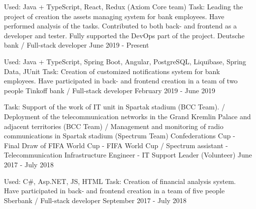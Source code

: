

\vspace{0cm}\begin{cventries}
\cventry
{Used: Java + TypeScript, React, Redux (Axiom Core team)
	\newline Task: Leading the project of creation the assets managing system for bank employees. Have performed analysis of the tasks. Contributed to both back- and frontend as a developer and tester. Fully supported the DevOps part of the project.	
} %
{Deutsche bank / Full-stack developer} %
{} %
{June 2019 - Present} %
\noindent	
	
\cventry
{Used: Java + TypeScript, Spring Boot, Angular, PostgreSQL, Liquibase, Spring Data, JUnit
	\newline Task: Creation of customized notifications system for bank employees. Have participated in back- and frontend creation in a team of two people} %
{Tinkoff bank / Full-stack developer } %
{} %
{February 2019 - June 2019} %
\noindent	
	
\cventry
{Task: Support of the work of IT unit in Spartak stadium (BCC Team). /
Deployment of the telecommunication networks in the Grand Kremlin Palace and adjacent territories (BCC Team) /
Management and monitoring of radio communications in Spartak stadium (Spectrum Team)} %
{Confederations Cup - Final Draw of FIFA World Cup - FIFA World Cup / 
	Spectrum assistant - Telecommunication Infrastructure Engineer  - IT Support Leader (Volunteer)} %
{} %
{June 2017 - July 2018} %
\noindent	

\cventry
{Used: C\#, Asp.NET, JS, HTML
	\newline Task: Creation of financial analysis system. Have participated in back- and frontend creation in a team of five people} %
{Sberbank / Full-stack developer} %
{} %
{September 2017 - July 2018} %
\noindent	




\end{cventries}
